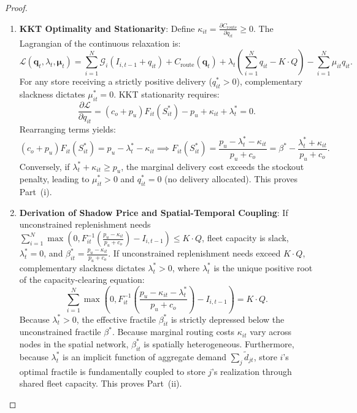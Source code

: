 \documentclass[11pt,a4paper]{article}
\theoremstyle{definition}
\theoremstyle{remark}
\begin{document}
\begin{itemize}[leftmargin=*]
\begin{proof}
\begin{enumerate}[label=\textbf{Part \arabic*.},wide=0pt]
        \item \textbf{KKT Optimality and Stationarity}:
        Define $\kappa_{it} = \frac{\partial C_{\text{route}}}{\partial q_{it}} \ge 0$. The Lagrangian of the continuous relaxation is:
        \begin{equation*}
            \mathcal{L}(\mathbf{q}_t, \lambda_t, \boldsymbol{\mu}_t) = \sum_{i=1}^N \mathcal{G}_i(I_{i,t-1} + q_{it}) + C_{\text{route}}(\mathbf{q}_t) + \lambda_t \left( \sum_{i=1}^N q_{it} - K \cdot Q \right) - \sum_{i=1}^N \mu_{it} q_{it}.
        \end{equation*}
        For any store receiving a strictly positive delivery ($q_{it}^* > 0$), complementary slackness dictates $\mu_{it}^* = 0$. KKT stationarity requires:
        \begin{equation*}
            \frac{\partial \mathcal{L}}{\partial q_{it}} = (c_o + p_u) F_{it}(S_{it}^*) - p_u + \kappa_{it} + \lambda_t^* = 0.
        \end{equation*}
        Rearranging terms yields:
        \begin{equation*}
            (c_o + p_u) F_{it}(S_{it}^*) = p_u - \lambda_t^* - \kappa_{it} \implies F_{it}(S_{it}^*) = \frac{p_u - \lambda_t^* - \kappa_{it}}{p_u + c_o} = \beta^* - \frac{\lambda_t^* + \kappa_{it}}{p_u + c_o}.
        \end{equation*}
        Conversely, if $\lambda_t^* + \kappa_{it} \ge p_u$, the marginal delivery cost exceeds the stockout penalty, leading to $\mu_{it}^* > 0$ and $q_{it}^* = 0$ (no delivery allocated). This proves Part~(i).

        \item \textbf{Derivation of Shadow Price and Spatial-Temporal Coupling}:
        If unconstrained replenishment needs $\sum_{i=1}^N \max\left(0, F_{it}^{-1}\left(\frac{p_u - \kappa_{it}}{p_u + c_o}\right) - I_{i,t-1}\right) \le K \cdot Q$, fleet capacity is slack, $\lambda_t^* = 0$, and $\beta_{it}^* = \frac{p_u - \kappa_{it}}{p_u + c_o}$.
        If unconstrained replenishment needs exceed $K \cdot Q$, complementary slackness dictates $\lambda_t^* > 0$, where $\lambda_t^*$ is the unique positive root of the capacity-clearing equation:
        \begin{equation*}
            \sum_{i=1}^N \max\left(0, F_{it}^{-1}\left( \frac{p_u - \kappa_{it} - \lambda_t^*}{p_u + c_o} \right) - I_{i,t-1}\right) = K \cdot Q.
        \end{equation*}
        Because $\lambda_t^* > 0$, the effective fractile $\beta_{it}^*$ is strictly depressed below the unconstrained fractile $\beta^*$. Because marginal routing costs $\kappa_{it}$ vary across nodes in the spatial network, $\beta_{it}^*$ is spatially heterogeneous. Furthermore, because $\lambda_t^*$ is an implicit function of aggregate demand $\sum_j \tilde{d}_{jt}$, store $i$'s optimal fractile is fundamentally coupled to store $j$'s realization through shared fleet capacity. This proves Part~(ii).


\end{enumerate}
\end{proof}
\end{itemize}
\end{document}

